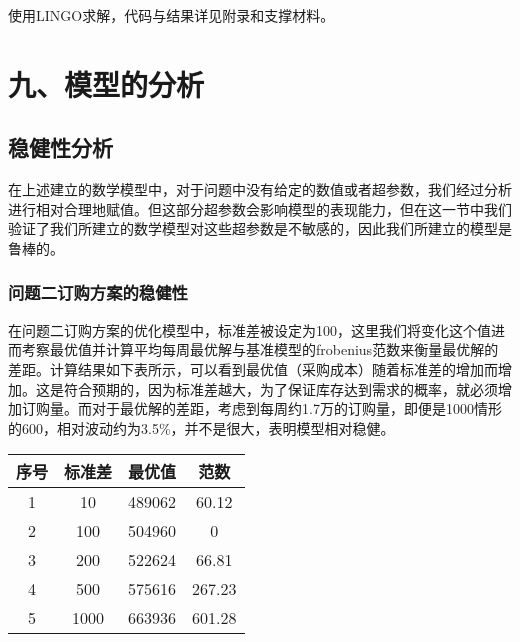 \documentclass{my_paper}
\begin{document}
使用LINGO求解，代码与结果详见附录和支撑材料。

\section{九、模型的分析}

\subsection{稳健性分析}

在上述建立的数学模型中，对于问题中没有给定的数值或者超参数，我们经过分析进行相对合理地赋值。但这部分超参数会影响模型的表现能力，但在这一节中我们验证了我们所建立的数学模型对这些超参数是不敏感的，因此我们所建立的模型是鲁棒的。

\subsubsection{问题二订购方案的稳健性}
在问题二订购方案的优化模型中，标准差被设定为100，这里我们将变化这个值进而考察最优值并计算平均每周最优解与基准模型的frobenius范数来衡量最优解的差距。计算结果如下表所示，可以看到最优值（采购成本）随着标准差的增加而增加。这是符合预期的，因为标准差越大，为了保证库存达到需求的概率，就必须增加订购量。而对于最优解的差距，考虑到每周约1.7万的订购量，即便是1000情形的600，相对波动约为3.5\%，并不是很大，表明模型相对稳健。

\begin{table}[h]
    \centering
\begin{tabular}{cccc}
	
	序号&标准差&最优值& 范数 \\
	\hline\hline
	1&10&489062& 60.12\\
	\hline
	2&100&504960& 0\\
	\hline
	3&200&522624& 66.81\\
	\hline
	4&500&575616& 267.23\\
	\hline
	5&1000&663936& 601.28\\
	\hline
\end{tabular}
\end{table}
\end{document}
